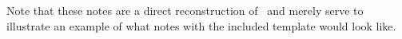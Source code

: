 \documentclass[../notes.tex]{subfile}
\begin{document}
\begin{refsection}

Note that these notes are a direct reconstruction of~\cite{StochasticAnalysisNotes} 
and merely serve to illustrate an example of what notes with the included template
would look like. 





\end{refsection}
\end{document}
